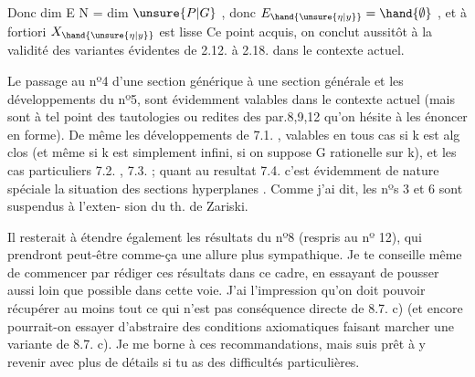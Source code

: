 
Donc dim E \hand{$<$} N = dim $\unsure{P|G}$ , donc $E_{\hand{\unsure{\eta|y}}} = \hand{\emptyset}$ , et à fortiori $X_{\hand{\unsure{\eta|y}}}$ est lisse
Ce point acquis, on conclut aussitôt à la validité des variantes
évidentes de 2.12. à 2.18. dans le contexte actuel.

Le passage au nº4 d'une section générique à une section générale
et les développements du nº5, sont évidemment valables dans le contexte
actuel (mais sont à tel point des tautologies ou redites des
par.8,9,12  qu'on hésite à les énoncer en forme). De même les
développements de 7.1. , valables en tous cas si k est  alg clos
(et même si k est simplement infini, si on suppose G rationelle sur k),
et les cas particuliers 7.2. , 7.3. ; quant au resultat 7.4. 
c'est évidemment  de nature spéciale   la situation des sections
hyperplanes . Comme j'ai dit, les nºs 3 et 6 sont suspendus à l'exten-%
sion du th. de Zariski.

Il resterait à étendre également les résultats du nº8 (respris au
nº 12), qui prendront peut-être comme-ça une allure plus sympathique.
Je te conseille même de commencer par rédiger ces résultats dans ce cadre,
en essayant de pousser aussi loin que possible dans cette voie. J'ai
l'impression qu'on doit pouvoir récupérer au moins tout ce qui n'est pas
conséquence directe de 8.7. c) (et encore pourrait-on essayer
d'abstraire des conditions axiomatiques faisant marcher une variante de
8.7. c). Je me borne à ces recommandations, mais suis prêt à y revenir
avec plus de détails si tu as des difficultés particulières.

